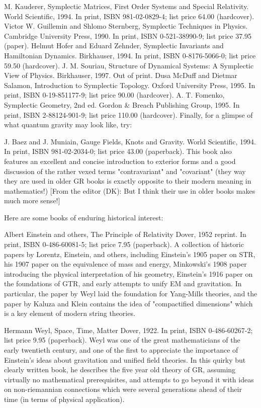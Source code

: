 \documentclass[10pt,a4paper]{book}
\theoremstyle{definition}
\begin{document}
M. Kauderer,
Symplectic Matrices, First Order Systems and Special Relativity.
World Scientific, 1994.
In print, ISBN 981-02-0829-4; list price 64.00 (hardcover).
Victor W. Guillemin and Shlomo Sternberg,
Symplectic Techniques in Physics.
Cambridge University Press, 1990.
In print, ISBN 0-521-38990-9; list price 37.95 (paper).
Helmut Hofer and Eduard Zehnder,
Symplectic Invariants and Hamiltonian Dynamics.
Birkhauser, 1994.
In print, ISBN 0-8176-5066-0; list price 59.50 (hardcover).
J. M. Souriau,
Structure of Dynamical Systems: A Symplectic View of Physics.
Birkhauser, 1997.
Out of print.
Dusa McDuff and Dietmar Salamon,
Introduction to Symplectic Topology.
Oxford University Press, 1995.
In print, ISBN 0-19-851177-9; list price 90.00 (hardcover).
A. T. Fomenko,
Symplectic Geometry, 2nd ed.
Gordon \& Breach Publishing Group, 1995.
In print, ISBN 2-88124-901-9; list price 110.00 (hardcover).
Finally, for a glimpse of what quantum gravity may look like, try:

J. Baez and J. Muniain,
Gauge Fields, Knots and Gravity.
World Scientific, 1994.
In print, ISBN 981-02-2034-0; list price 43.00 (paperback).
This book also features an excellent and concise introduction to exterior forms and a good discussion of the rather vexed terms "contravariant" and "covariant" (they way they are used in older GR books is exactly opposite to their modern meaning in mathematics!) [From the editor (DK): But I think their use in older books makes much more sense!]

Here are some books of enduring historical interest:

Albert Einstein and others,
The Principle of Relativity
Dover, 1952 reprint.
In print, ISBN 0-486-60081-5; list price 7.95 (paperback).
A collection of historic papers by Lorentz, Einstein, and others, including Einstein's 1905 paper on STR, his 1907 paper on the equivalence of mass and energy, Minkowski's 1908 paper introducing the physical interpretation of his geometry, Einstein's 1916 paper on the foundations of GTR, and early attempts to unify EM and gravitation.  In particular, the paper by Weyl laid the foundation for Yang-Mills theories, and the paper by Kaluza and Klein contains the idea of "compactified dimensions" which is a key element of modern string theories.

Hermann Weyl,
Space, Time, Matter
Dover, 1922.
In print, ISBN 0-486-60267-2; list price 9.95 (paperback).
Weyl was one of the great mathematicians of the early twentieth century, and one of the first to appreciate the importance of Einstein's ideas about gravitation and unified field theories.  In this quirky but clearly written book, he describes the five year old theory of GR, assuming virtually no mathematical prerequisites, and attempts to go beyond it with ideas on non-riemannian connections which were several generations ahead of their time (in terms of physical application).
\end{document}
